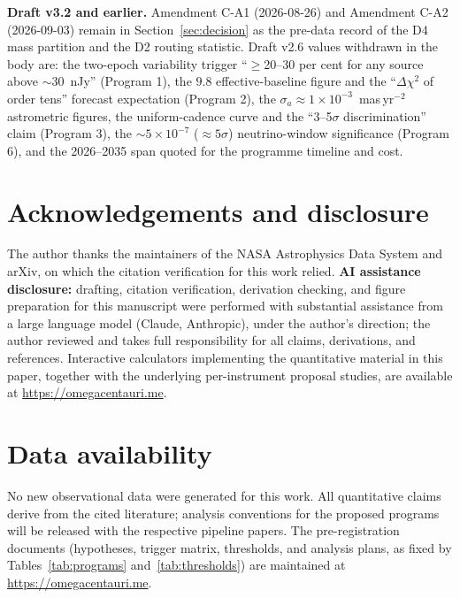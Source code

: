 \documentclass[11pt]{article}
\begin{document}
\textbf{Draft v3.2 and earlier.} Amendment C-A1 (2026-08-26) and Amendment C-A2 (2026-09-03) remain in Section~\ref{sec:decision} as the pre-data record of the D4 mass partition and the D2 routing statistic. Draft v2.6 values withdrawn in the body are: the two-epoch variability trigger ``$\geq$20--30 per cent for any source above $\sim$30~nJy'' (Program 1), the $9.8$ effective-baseline figure and the ``$\Delta\chi^{2}$ of order tens'' forecast expectation (Program 2), the $\sigma_{a} \approx 1\times10^{-3}$~mas\,yr$^{-2}$ astrometric figures, the uniform-cadence curve and the ``3--5$\sigma$ discrimination'' claim (Program 3), the $\sim 5\times10^{-7}$ ($\approx 5\sigma$) neutrino-window significance (Program 6), and the 2026--2035 span quoted for the programme timeline and cost.

\section*{Acknowledgements and disclosure}

The author thanks the maintainers of the NASA Astrophysics Data System and arXiv, on which the citation verification for this work relied. \textbf{AI assistance disclosure:} drafting, citation verification, derivation checking, and figure preparation for this manuscript were performed with substantial assistance from a large language model (Claude, Anthropic), under the author's direction; the author reviewed and takes full responsibility for all claims, derivations, and references. Interactive calculators implementing the quantitative material in this paper, together with the underlying per-instrument proposal studies, are available at \url{https://omegacentauri.me}.

\section*{Data availability}

No new observational data were generated for this work. All quantitative claims derive from the cited literature; analysis conventions for the proposed programs will be released with the respective pipeline papers. The pre-registration documents (hypotheses, trigger matrix, thresholds, and analysis plans, as fixed by Tables~\ref{tab:programs} and~\ref{tab:thresholds}) are maintained at \url{https://omegacentauri.me}.



\end{document}
